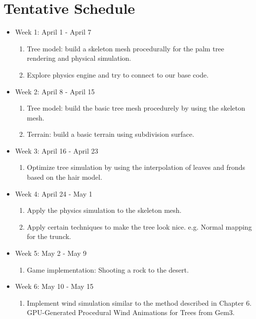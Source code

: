 \documentclass[11pt]{article}
\begin{document}
\section{Tentative Schedule}
\begin{itemize}
\item{Week 1: April 1 - April 7}

\begin{enumerate}
\item{Tree model: build a skeleton mesh procedurally for the palm tree rendering and physical simulation.}
\item{Explore physics engine and try to connect to our base code.}
\end{enumerate}

\item{Week 2: April 8 - April 15}

\begin{enumerate}
\item{Tree model: build the basic tree mesh procedurely by using the skeleton mesh.}
\item{Terrain: build a basic terrain using subdivision surface.}

\end{enumerate}

\item{Week 3: April 16 - April 23}

\begin{enumerate}
\item{Optimize tree simulation by using the interpolation of leaves and fronds based on the hair model.}

\end{enumerate}

\item{Week 4: April 24 - May 1}

\begin{enumerate}
\item{Apply the physics simulation to the skeleton mesh.}
\item{Apply certain techniques to make the tree look nice. e.g. Normal mapping for the trunck.}
\end{enumerate}

\item{Week 5: May 2 - May 9}

\begin{enumerate}
\item{Game implementation: Shooting a rock to the desert.}

\end{enumerate}

\item{Week 6: May 10 - May 15}

\begin{enumerate}
\item{Implement wind simulation similar to the method described in Chapter 6. GPU-Generated Procedural Wind Animations for Trees from Gem3. }
\end{enumerate}

\end{itemize}
\end{document}
